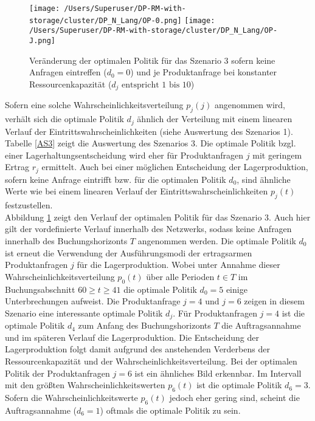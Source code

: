 \begin{figure}[h!]     
\begin{center}
\texttt{[image: /Users/Superuser/DP-RM-with-storage/cluster/DP\_N\_Lang/OP-0.png]}
\texttt{[image: /Users/Superuser/DP-RM-with-storage/cluster/DP\_N\_Lang/OP-J.png]}
    \caption{Veränderung der optimalen Politik für das Szenario 3 sofern keine Anfragen eintreffen ($d_0=0$) und je Produktanfrage bei konstanter Ressourcenkapazität ($d_j\text{ entspricht }1\text{ bis }10$)}  \label{SV3}
  \end{center}
\end{figure}

Sofern eine solche Wahrscheinlichkeitsverteilung $p_j(j)$ angenommen wird, verhält sich die optimale Politik $d_j$ ähnlich der Verteilung mit einem linearen Verlauf der Eintrittswahrscheinlichkeiten (siehe Auswertung des Szenarios 1). Tabelle \ref{AS3} zeigt die Auswertung des Szenarios 3. Die optimale Politik bzgl. einer Lagerhaltungsentscheidung wird eher für Produktanfragen $j$ mit geringem Ertrag $r_j$ ermittelt. Auch bei einer möglichen Entscheidung der Lagerproduktion, sofern keine Anfrage eintrifft bzw. für die optimalen Politik $d_0$, sind ähnliche Werte wie bei einem linearen Verlauf der Eintrittswahrscheinlichkeiten $p_j(t)$ festzustellen.\\[.5cm]

Abbildung \ref{SV3} zeigt den Verlauf der optimalen Politik für das Szenario 3. Auch hier gilt der vordefinierte Verlauf innerhalb des Netzwerks, sodass keine Anfragen innerhalb des Buchungshorizonts $T$ angenommen werden. Die optimale Politik $d_0$ ist erneut die Verwendung der Ausführungsmodi der ertragsarmen Produktanfragen $j$ für die Lagerproduktion. Wobei unter Annahme dieser Wahrscheinlichkeitsverteilung $p_0(t)$ über alle Perioden $t\in T$ im Buchungsabschnitt $60\ge t \ge 41$ die optimale Politik $d_0=5$ einige Unterbrechungen aufweist. Die Produktanfrage $j=4$ und $j=6$ zeigen in diesem Szenario eine interessante optimale Politik $d_j$. Für Produktanfragen $j=4$ ist die optimale Politik $d_4$ zum Anfang des Buchungshorizonts $T$ die Auftragsannahme und im späteren Verlauf die Lagerproduktion. Die Entscheidung der Lagerproduktion folgt damit aufgrund des anstehenden Verderbens der Ressourcenkapazität und der Wahrscheinlichkeitsverteilung. Bei der optimalen Politik der Produktanfragen $j=6$ ist ein ähnliches Bild erkennbar. Im Intervall mit den größten Wahrscheinlichkeitswerten $p_6(t)$ ist die optimale Politik $d_6=3$. Sofern die Wahrscheinlichkeitswerte $p_6(t)$ jedoch eher gering sind, scheint die Auftragsannahme ($d_6=1$) oftmals die optimale Politik zu sein. 

